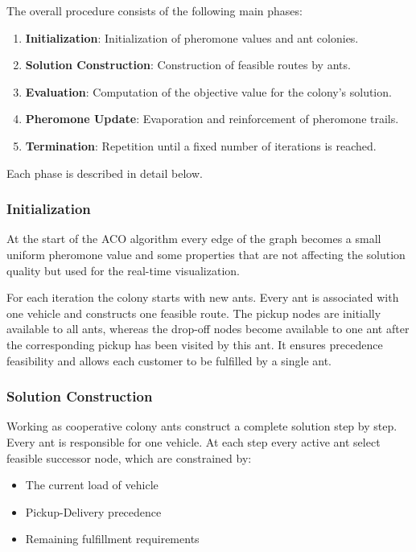 \documentclass[12pt]{article}
\begin{document}
The overall procedure consists of the following main phases:

\begin{enumerate}
    \item \textbf{Initialization}: Initialization of pheromone values and ant colonies.
    \item \textbf{Solution Construction}: Construction of feasible routes by ants.
    \item \textbf{Evaluation}: Computation of the objective value for the colony's solution.
    \item \textbf{Pheromone Update}: Evaporation and reinforcement of pheromone trails.
    \item \textbf{Termination}: Repetition until a fixed number of iterations is reached.
\end{enumerate}

Each phase is described in detail below.

\subsubsection{Initialization}

At the start of the ACO algorithm every edge of the graph becomes a small uniform pheromone value and some properties that are not affecting the solution quality but used for the real-time visualization.

For each iteration the colony starts with new ants. Every ant is associated with one vehicle and constructs one feasible route. The pickup nodes are initially available to all ants, whereas the drop-off nodes become available to one ant after the corresponding pickup has been visited by this ant. It ensures precedence feasibility and allows each customer to be fulfilled by a single ant.

\subsubsection{Solution Construction}

Working as cooperative colony ants construct a complete solution step by step. Every ant is responsible for one vehicle. At each step every active ant select feasible successor node, which are constrained by:

\begin{itemize}
    \item The current load of vehicle
    \item Pickup-Delivery precedence
    \item Remaining fulfillment requirements
\end{itemize}
\end{document}
